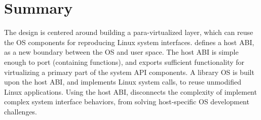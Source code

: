 \section{Summary}
\label{sec:graphene:summary}

The \graphene{} design is centered around
building a para-virtualized layer, which can reuse the OS components for reproducing Linux system interfaces.
\graphene{} defines a host ABI, as a new boundary between the OS and user space.
The host ABI is simple enough to port (containing \palcalls{} functions),
and exports sufficient functionality for virtualizing a primary part of the system API components.
A library OS is built upon the host ABI,
and implements \graphenesyscalls{} Linux system calls, to reuse unmodified Linux applications.
Using the host ABI, \graphene{} disconnects the complexity of implement complex system interface behaviors,
from solving host-specific OS development challenges.








